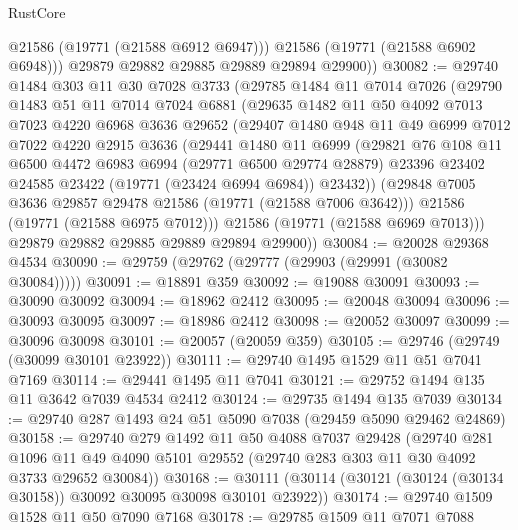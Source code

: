 \begin{lexlean}{RustCore}
\begin{coremodule}
            @21586
            (@19771 (@21588 @6912 @6947)))
          @21586
          (@19771 (@21588 @6902 @6948)))
        @29879
        @29882
        @29885
        @29889
        @29894
        @29900))
@30082 := @29740
    @1484
    @303
    @11
    @30
    @7028
    @3733
    (@29785
      @1484
      @11
      @7014
      @7026
      (@29790
        @1483
        @51
        @11
        @7014
        @7024
        @6881
        (@29635
          @1482
          @11
          @50
          @4092
          @7013
          @7023
          @4220
          @6968
          @3636
          @29652
          (@29407
            @1480
            @948
            @11
            @49
            @6999
            @7012
            @7022
            @4220
            @2915
            @3636
            (@29441
              @1480
              @11
              @6999
              (@29821
                @76
                @108
                @11
                @6500
                @4472
                @6983
                @6994
                (@29771 @6500 @29774 @28879)
                @23396
                @23402
                @24585
                @23422
                (@19771 (@23424 @6994 @6984))
                @23432))
            (@29848 @7005 @3636 @29857 @29478 @21586 (@19771 (@21588 @7006 @3642)))
            @21586
            (@19771 (@21588 @6975 @7012)))
          @21586
          (@19771 (@21588 @6969 @7013)))
        @29879
        @29882
        @29885
        @29889
        @29894
        @29900))
@30084 := @20028 @29368 @4534
@30090 := @29759 (@29762 (@29777 (@29903 (@29991 (@30082 @30084)))))
@30091 := @18891 @359
@30092 := @19088 @30091
@30093 := @30090 @30092
@30094 := @18962 @2412
@30095 := @20048 @30094
@30096 := @30093 @30095
@30097 := @18986 @2412
@30098 := @20052 @30097
@30099 := @30096 @30098
@30101 := @20057 (@20059 @359)
@30105 := @29746 (@29749 (@30099 @30101 @23922))
@30111 := @29740 @1495 @1529 @11 @51 @7041 @7169
@30114 := @29441 @1495 @11 @7041
@30121 := @29752 @1494 @135 @11 @3642 @7039 @4534 @2412
@30124 := @29735 @1494 @135 @7039
@30134 := @29740 @287 @1493 @24 @51 @5090 @7038 (@29459 @5090 @29462 @24869)
@30158 := @29740
    @279
    @1492
    @11
    @50
    @4088
    @7037
    @29428
    (@29740
      @281
      @1096
      @11
      @49
      @4090
      @5101
      @29552
      (@29740 @283 @303 @11 @30 @4092 @3733 @29652 @30084))
@30168 := @30111 (@30114 (@30121 (@30124 (@30134 @30158)) @30092 @30095 @30098 @30101 @23922))
@30174 := @29740 @1509 @1528 @11 @50 @7090 @7168
@30178 := @29785 @1509 @11 @7071 @7088

\end{coremodule}
\end{lexlean}
